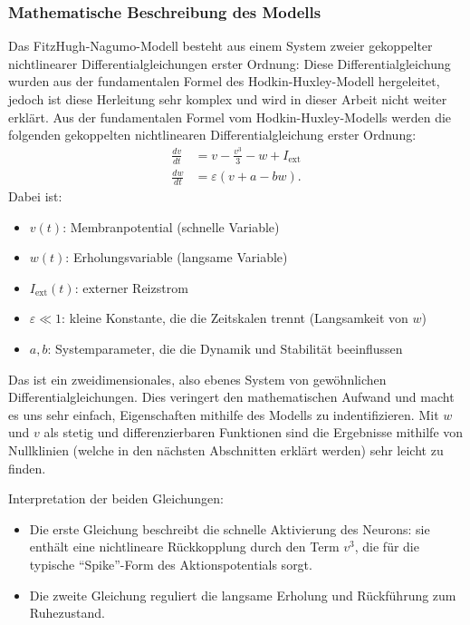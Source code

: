 \subsubsection{Mathematische Beschreibung des Modells}
Das FitzHugh-Nagumo-Modell besteht aus einem System zweier gekoppelter nichtlinearer Differentialgleichungen erster Ordnung:
Diese Differentialgleichung wurden aus der fundamentalen Formel des Hodkin-Huxley-Modell hergeleitet, jedoch ist diese Herleitung sehr komplex und wird in dieser Arbeit nicht weiter erklärt. Aus der fundamentalen Formel vom Hodkin-Huxley-Modells werden die folgenden gekoppelten nichtlinearen Differentialgleichung erster Ordnung:
\begin{align*}
	\frac{dv}{dt} &= v - \frac{v^3}{3} - w + I_{\text{ext}} \\
	\frac{dw}{dt} &= \varepsilon (v + a - b w).
\end{align*}
Dabei ist:

\begin{itemize}
	\item $v(t)$: Membranpotential (schnelle Variable)
	\item $w(t)$: Erholungsvariable (langsame Variable)
	\item $I_{\text{ext}}(t)$: externer Reizstrom
	\item $\varepsilon \ll 1$: kleine Konstante, die die Zeitskalen trennt (Langsamkeit von $w$)
	\item $a, b$: Systemparameter, die die Dynamik und Stabilität beeinflussen
\end{itemize}
Das ist ein zweidimensionales, also ebenes System von gewöhnlichen Differentialgleichungen. Dies veringert den mathematischen Aufwand und macht es uns sehr einfach, Eigenschaften mithilfe des Modells zu indentifizieren.
Mit $w$ und $v$ als stetig und differenzierbaren Funktionen sind die Ergebnisse mithilfe von Nullklinien (welche in den nächsten Abschnitten erklärt werden) sehr leicht zu finden.

Interpretation der beiden Gleichungen:
\begin{itemize}
    \item Die erste Gleichung beschreibt die schnelle Aktivierung des Neurons: sie enthält eine nichtlineare Rückkopplung durch den Term $v^3$, die für die typische ``Spike''-Form des Aktionspotentials sorgt.
    \item Die zweite Gleichung reguliert die langsame Erholung und Rückführung zum Ruhezustand.
\end{itemize}
